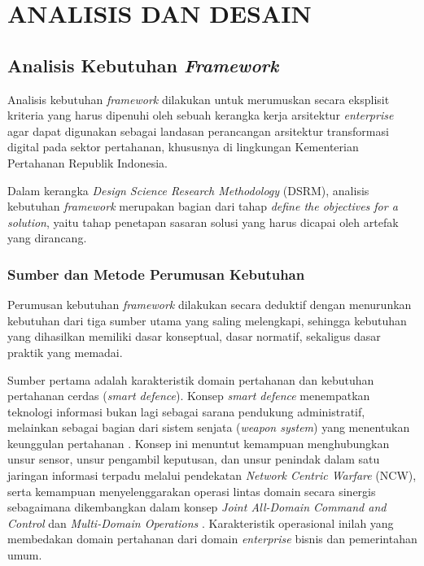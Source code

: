 \chapter{ANALISIS DAN DESAIN}
\label{chap:analisis-desain}

\section{Analisis Kebutuhan \textit{Framework}}
\label{sec:analisis-kebutuhan-framework}

Analisis kebutuhan \textit{framework} dilakukan untuk merumuskan secara eksplisit kriteria yang harus dipenuhi oleh sebuah kerangka kerja arsitektur \textit{enterprise} agar dapat digunakan sebagai landasan perancangan arsitektur transformasi digital pada sektor pertahanan, khususnya di lingkungan Kementerian Pertahanan Republik Indonesia.

Dalam kerangka \textit{Design Science Research Methodology} (DSRM), analisis kebutuhan \textit{framework} merupakan bagian dari tahap \textit{define the objectives for a solution}, yaitu tahap penetapan sasaran solusi yang harus dicapai oleh artefak yang dirancang.

\subsection{Sumber dan Metode Perumusan Kebutuhan}

Perumusan kebutuhan \textit{framework} dilakukan secara deduktif dengan menurunkan kebutuhan dari tiga sumber utama yang saling melengkapi, sehingga kebutuhan yang dihasilkan memiliki dasar konseptual, dasar normatif, sekaligus dasar praktik yang memadai.

Sumber pertama adalah karakteristik domain pertahanan dan kebutuhan pertahanan cerdas (\textit{smart defence}). Konsep \textit{smart defence} menempatkan teknologi informasi bukan lagi sebagai sarana pendukung administratif, melainkan sebagai bagian dari sistem senjata (\textit{weapon system}) yang menentukan keunggulan pertahanan \parencite{KemhanRI2021}. Konsep ini menuntut kemampuan menghubungkan unsur sensor, unsur pengambil keputusan, dan unsur penindak dalam satu jaringan informasi terpadu melalui pendekatan \textit{Network Centric Warfare} (NCW), serta kemampuan menyelenggarakan operasi lintas domain secara sinergis sebagaimana dikembangkan dalam konsep \textit{Joint All-Domain Command and Control} dan \textit{Multi-Domain Operations} \parencite{USArmyMDO2018}. Karakteristik operasional inilah yang membedakan domain pertahanan dari domain \textit{enterprise} bisnis dan pemerintahan umum.

